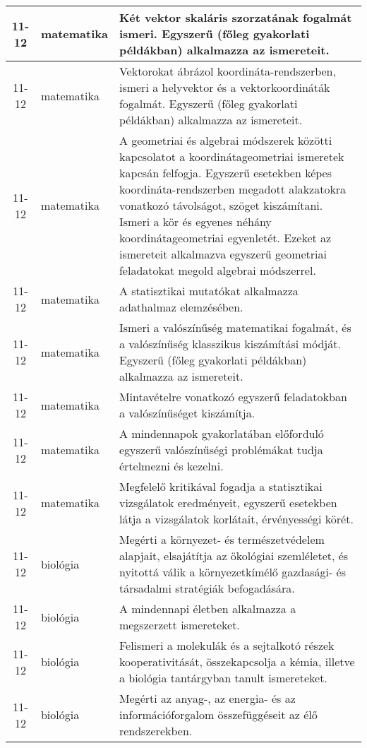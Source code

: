 \begin{small}
\begin{longtable}{c | p{2cm} |  p{11cm} }
              11-12 & matematika & Két vektor skaláris szorzatának fogalmát ismeri.  Egyszerű (főleg gyakorlati példákban) alkalmazza az ismereteit. \\ \hline
              11-12 & matematika & Vektorokat ábrázol koordináta-rendszerben, ismeri a helyvektor és a vektorkoordináták fogalmát. Egyszerű (főleg gyakorlati példákban) alkalmazza az ismereteit. \\ \hline
              11-12 & matematika & A geometriai és algebrai módszerek közötti kapcsolatot a koordinátageometriai ismeretek kapcsán felfogja. Egyszerű esetekben képes koordináta-rendszerben megadott alakzatokra vonatkozó távolságot, szöget kiszámítani. Ismeri a kör és egyenes néhány koordinátageometriai egyenletét. Ezeket az ismereteit alkalmazva egyszerű geometriai feladatokat megold algebrai módszerrel. \\ \hline
              11-12 & matematika & A statisztikai mutatókat alkalmazza adathalmaz elemzésében. \\ \hline
              11-12 & matematika & Ismeri a valószínűség matematikai fogalmát, és a valószínűség klasszikus kiszámítási módját. Egyszerű (főleg gyakorlati példákban) alkalmazza az ismereteit. \\ \hline
              11-12 & matematika & Mintavételre vonatkozó egyszerű feladatokban a valószínűséget kiszámítja. \\ \hline
              11-12 & matematika & A mindennapok gyakorlatában előforduló egyszerű valószínűségi problémákat tudja értelmezni és kezelni. \\ \hline
              11-12 & matematika & Megfelelő kritikával fogadja a statisztikai vizsgálatok eredményeit, egyszerű esetekben látja a vizsgálatok korlátait, érvényességi körét. \\ \hline
              11-12 & biológia & Megérti a környezet- és természetvédelem alapjait, elsajátítja az ökológiai szemléletet, és nyitottá válik a környezetkímélő gazdasági- és társadalmi stratégiák befogadására. \\ \hline
              11-12 & biológia & A mindennapi életben alkalmazza a megszerzett ismereteket. \\ \hline
              11-12 & biológia & Felismeri a molekulák és a sejtalkotó részek kooperativitását, összekapcsolja  a kémia, illetve a biológia tantárgyban tanult ismereteket. \\ \hline
              11-12 & biológia & Megérti az anyag-, az energia- és az információforgalom összefüggéseit az élő rendszerekben. \\ \hline

\end{longtable}
\end{small}
